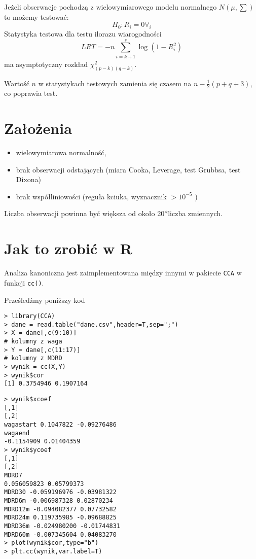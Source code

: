 \documentclass[polish,]{book}
\begin{document}
Jeżeli obserwacje pochodzą z wielowymiarowego modelu normalnego \(N(\mu,\sum)\) to
możemy testować:
\[H_0:R_i=0\forall_i\]
Statystyka testowa dla testu ilorazu wiarogodności
\[LRT=-n\sum_{i=k+1}^{s}\log(1-R^2_i)\]
ma asymptotyczny rozkład \(\chi^2_{(p-k)(q-k)}\).

Wartość \(n\) w statystykach testowych zamienia się czasem na \(n - \frac{1}{2} (p + q + 3)\), co poprawia test.

\hypertarget{part_53}{%
\section{Założenia}\label{part_53}}

\begin{itemize}
\item
  wielowymiarowa normalność,
\item
  brak obserwacji odstających (miara Cooka, Leverage, test Grubbsa, test Dixona)
\item
  brak współliniowości (reguła kciuka, wyznacznik \(>10^{-5}\) )
\end{itemize}

Liczba obserwacji powinna być większa od około 20*liczba zmiennych.

\hypertarget{part_54}{%
\section{Jak to zrobić w R}\label{part_54}}

Analiza kanoniczna jest zaimplementowana między innymi w pakiecie \texttt{CCA} w funkcji \texttt{cc()}.

Prześledźmy poniższy kod

\begin{verbatim}
> library(CCA)
> dane = read.table("dane.csv",header=T,sep=";")
> X = dane[,c(9:10)]
# kolumny z waga
> Y = dane[,c(11:17)]
# kolumny z MDRD
> wynik = cc(X,Y)
> wynik$cor
[1] 0.3754946 0.1907164
\end{verbatim}

\begin{verbatim}
> wynik$xcoef
[,1]
[,2]
wagastart 0.1047822 -0.09276486
wagaend
-0.1154909 0.01404359
> wynik$ycoef
[,1]
[,2]
MDRD7
0.056059823 0.05799373
MDRD30 -0.059196976 -0.03981322
MDRD6m -0.006987328 0.02870234
MDRD12m -0.094082377 0.07732582
MDRD24m 0.119735985 -0.09688825
MDRD36m -0.024980200 -0.01744831
MDRD60m -0.007345604 0.04083270
> plot(wynik$cor,type="b")
> plt.cc(wynik,var.label=T)
\end{verbatim}
\end{document}
